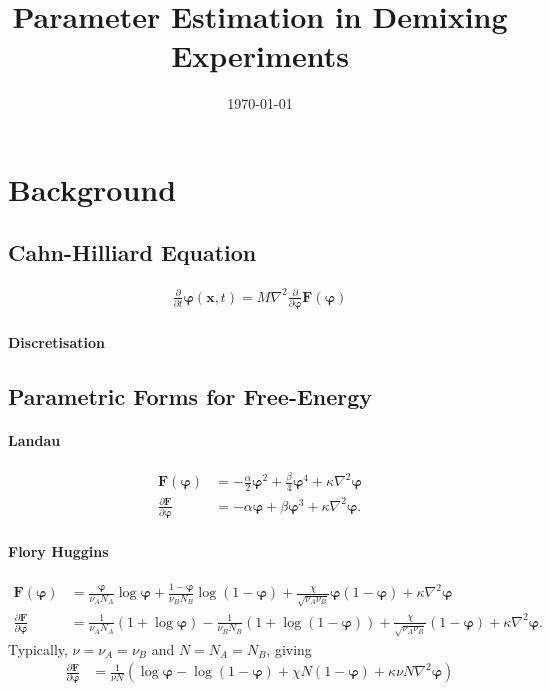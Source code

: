 \documentclass[a4paper,oneside]{article}
\title{Parameter Estimation in Demixing Experiments}
\author{{}}\date{\today}
\newcommand{\pardiff}[2][]{\frac{\partial#1}{\partial#2}}
\newcommand{\lapl}{\nabla^2}
\newcommand{\vphi}{\bm\varphi}
\begin{document}
\maketitle

\section*{Background}
\subsection*{Cahn-Hilliard Equation}

\begin{align}
\pardiff{t}\vphi(\mathbf{x},t) = M\lapl\pardiff{\vphi}\bm{F}(\vphi)
\end{align}

\paragraph{Discretisation}

\subsection*{Parametric Forms for Free-Energy}
\paragraph{Landau}
\begin{align}
    \bm{F}(\vphi) &= -\frac{\alpha}{2}\vphi^2 + \frac{\beta}{4}\vphi^4 + \kappa\lapl\vphi \\
    \pardiff[\bm{F}]{\vphi} &= -\alpha\vphi + \beta\vphi^3 + \kappa\nabla^2\vphi.
\end{align}

\paragraph{Flory Huggins}
\begin{align}
    \bm{F}(\vphi) &= \frac{\vphi}{\nu_AN_A}\log\vphi + \frac{1-\vphi}{\nu_BN_B}\log(1-\vphi) + \frac{\chi}{\sqrt{\nu_A\nu_B}}\vphi(1-\vphi) + \kappa\nabla^2\vphi \\
    \pardiff[\bm{F}]{\vphi} &= \frac{1}{\nu_AN_A}(1+\log\vphi) - \frac{1}{\nu_BN_B}(1 + \log(1-\vphi)) + \frac{\chi}{\sqrt{\nu_A\nu_B}}(1-\vphi)+ \kappa\nabla^2\vphi.
\end{align}
Typically, $\nu = \nu_A = \nu_B$ and $N = N_A=N_B$, giving
\begin{align}
\pardiff[\bm{F}]{\vphi} &= \frac{1}{\nu N}\left(\log\vphi - \log(1-\vphi) + \chi N(1-\vphi) + \kappa\nu N \nabla^2\vphi\right)
\end{align}
\end{document}
